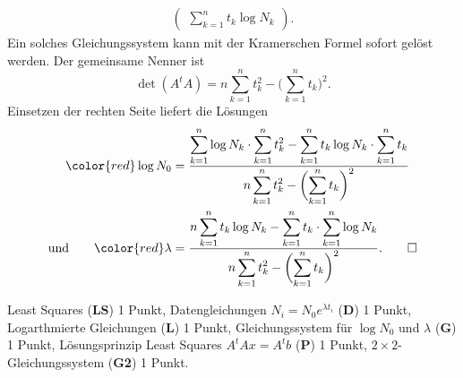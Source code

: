 \begin{loesung}
\begin{align*}
\begin{pmatrix}
\displaystyle \sum_{k=1}^n t_k \log N_k
\end{pmatrix}.
\end{align*}
Ein solches Gleichungssystem kann mit der Kramerschen Formel sofort gelöst
werden.
Der gemeinsame Nenner ist
\[
\det(A^tA)
=
n\sum_{k=1}^n t_k^2 - \biggl(\sum_{k=1}^n t_k\biggr)^2.
\]
Einsetzen der rechten Seite liefert die Lösungen
\begin{align*}
{\color{red}\log N_0}
&=
\frac{
\displaystyle
\sum_{k=1}^n \log N_k \cdot \sum_{k=1}^n t_k^2
-
\sum_{k=1}^n t_k\log N_k \cdot \sum_{k=1}^n t_k
}{
\displaystyle
n\sum_{k=1}^n t_k^2 - \biggl(\sum_{k=1}^n t_k\biggr)^2}
\\
\text{und}
\qquad
{\color{red}\lambda}
&=
\frac{
\displaystyle
n \sum_{k=1}^n t_k\log N_k
-
\sum_{k=1}^n t_k \cdot \sum_{k=1}^n \log N_k
}{
\displaystyle
n\sum_{k=1}^n t_k^2 - \biggl(\sum_{k=1}^n t_k\biggr)^2}.
\qedhere
\end{align*}
\end{loesung}

\begin{bewertung}
Least Squares ({\bf LS}) 1 Punkt,
Datengleichungen $N_i = N_0e^{\lambda t_i}$ ({\bf D}) 1 Punkt,
Logarthmierte Gleichungen ({\bf L}) 1 Punkt,
Gleichungssystem für $\log N_0$ und $\lambda$ ({\bf G}) 1 Punkt,
Lösungsprinzip Least Squares $A^tAx=A^tb$ ({\bf P}) 1 Punkt,
$2\times 2$-Gleichungssystem ({\bf G2}) 1 Punkt.
\end{bewertung}



